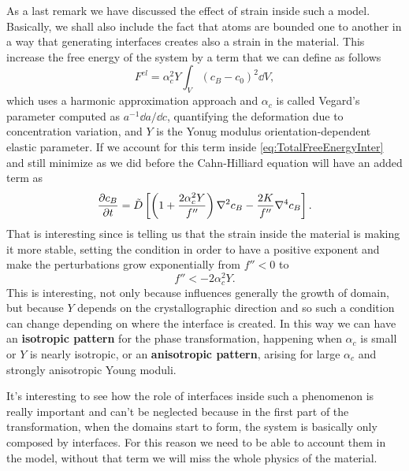 As a last remark we have discussed the effect of strain inside such a model. Basically, we shall also include the fact that atoms are bounded one to another in a way that generating interfaces creates also a strain in the material. This increase the free energy of the system by a term that we can define as follows
\begin{equation}
    F^{el} = \alpha^2_c Y\int_V (c_B - c_0)^2\dd V,
\end{equation}
which uses a harmonic approximation approach and $\alpha_c$ is called Vegard's parameter computed as $a^{-1}\dd a/\dd c$, quantifying the deformation due to concentration variation, and $Y$ is the Yonug modulus orientation-dependent elastic parameter. If we account for this term inside \eqref{eq:TotalFreeEnergyInter} and still minimize as we did before the Cahn-Hilliard equation will have an added term as
\begin{equation}
    \pdv{c_B}{t} = \tilde{D}\left[ \left( 1 + \frac{2\alpha_c^2Y}{f''} \right)\laplacian c_B - \frac{2K}{f''}\nabla^4 c_B \right].
\end{equation}
That is interesting since is telling us that the strain inside the material is making it more stable, setting the condition in order to have a positive exponent and make the perturbations grow exponentially from $f'' < 0$ to
\begin{equation}
    f'' < -2\alpha_c^2Y.
\end{equation}
This is interesting, not only because influences generally the growth of domain, but because $Y$ depends on the crystallographic direction and so such a condition can change depending on where the interface is created. In this way we can have an \textbf{isotropic pattern} for the phase transformation, happening when $\alpha_c$ is small or $Y$ is nearly isotropic, or an \textbf{anisotropic pattern}, arising for large $\alpha_c$ and strongly anisotropic Young moduli.

\nt
{
    It's interesting to see how the role of interfaces inside such a phenomenon is really important and can't be neglected because in the first part of the transformation, when the domains start to form, the system is basically only composed by interfaces. For this reason we need to be able to account them in the model, without that term we will miss the whole physics of the material.
}